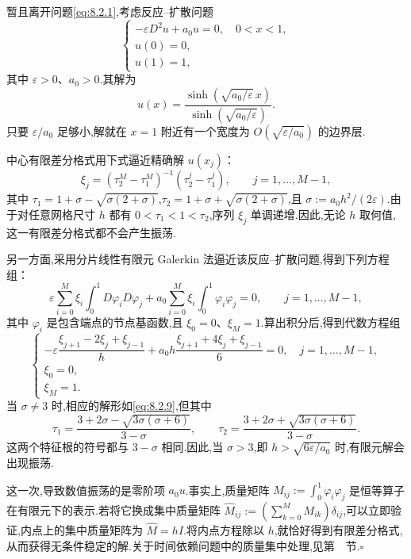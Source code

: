 \begin{note}
暂且离开问题\eqref{eq:8.2.1},考虑反应--扩散问题
\[
  \begin{cases}
    -\varepsilon D^2u+a_0u=0,\quad 0<x<1,\\
    u(0)=0,\\
    u(1)=1,
  \end{cases}
\]
其中 \(\varepsilon>0\)、\(a_0>0\).其解为
\[
  u(x)=\frac{\sinh(\sqrt{a_0/\varepsilon}\,x)}{\sinh(\sqrt{a_0/\varepsilon})}.
\]
只要 \(\varepsilon/a_0\) 足够小,解就在 \(x=1\) 附近有一个宽度为 \(O(\sqrt{\varepsilon/a_0})\) 的边界层.

中心有限差分格式用下式逼近精确解 \(u(x_j)\)：
\begin{equation}\label{eq:8.2.9}
  \xi_j=(\tau_2^M-\tau_1^M)^{-1}(\tau_2^j-\tau_1^j),\qquad j=1,\ldots,M-1,
\end{equation}
其中 \(\tau_1=1+\sigma-\sqrt{\sigma(2+\sigma)}\),\(\tau_2=1+\sigma+\sqrt{\sigma(2+\sigma)}\),且 \(\sigma:=a_0h^2/(2\varepsilon)\).由于对任意网格尺寸 \(h\) 都有 \(0<\tau_1<1<\tau_2\),序列 \(\xi_j\) 单调递增.因此,无论 \(h\) 取何值,这一有限差分格式都不会产生振荡.

另一方面,采用分片线性有限元 Galerkin 法逼近该反应--扩散问题,得到下列方程组：
\[
  \varepsilon\sum_{i=0}^M\xi_i\int_0^1D\varphi_iD\varphi_j
    +a_0\sum_{i=0}^M\xi_i\int_0^1\varphi_i\varphi_j=0,\qquad j=1,\ldots,M-1,
\]
其中 \(\varphi_i\) 是包含端点的节点基函数,且 \(\xi_0=0\)、\(\xi_M=1\).算出积分后,得到代数方程组
\[
  \begin{cases}
    -\varepsilon\dfrac{\xi_{j+1}-2\xi_j+\xi_{j-1}}h
       +a_0h\dfrac{\xi_{j+1}+4\xi_j+\xi_{j-1}}6=0,\quad j=1,\ldots,M-1,\\[6pt]
    \xi_0=0,\\
    \xi_M=1.
  \end{cases}
\]
当 \(\sigma\ne3\) 时,相应的解形如\eqref{eq:8.2.9},但其中
\[
  \tau_1=\frac{3+2\sigma-\sqrt{3\sigma(\sigma+6)}}{3-\sigma},\qquad
  \tau_2=\frac{3+2\sigma+\sqrt{3\sigma(\sigma+6)}}{3-\sigma}.
\]
这两个特征根的符号都与 \(3-\sigma\) 相同.因此,当 \(\sigma>3\),即 \(h>\sqrt{6\varepsilon/a_0}\) 时,有限元解会出现振荡.

这一次,导致数值振荡的是零阶项 \(a_0u\).事实上,质量矩阵 \(M_{ij}:=\int_0^1\varphi_i\varphi_j\) 是恒等算子在有限元下的表示.若将它换成{\heiti 集中质量矩阵} \(\widehat M_{ij}:=(\sum_{k=0}^M M_{ik})\delta_{ij}\),可以立即验证,内点上的集中质量矩阵为 \(\widehat M=hI\).将内点方程除以 \(h\),就恰好得到有限差分格式,从而获得无条件稳定的解.关于时间依赖问题中的质量集中处理,见第~~节.\hfill\(\square\)
\end{note}


